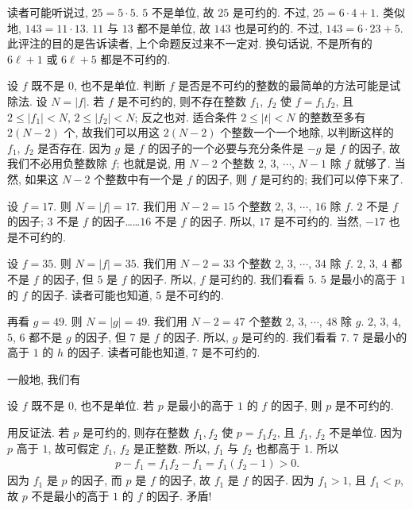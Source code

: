 \begin{remark}
    读者可能听说过, $25 = 5 \cdot 5$. $5$ 不是单位, 故 $25$ 是可约的. 不过, $25 = 6 \cdot 4 + 1$. 类似地, $143 = 11 \cdot 13$. $11$ 与 $13$ 都不是单位, 故 $143$ 也是可约的. 不过, $143 = 6 \cdot 23 + 5$. 此评注的目的是告诉读者, 上个命题反过来不一定对. 换句话说, 不是所有的 $6\ell + 1$ 或 $6\ell + 5$ 都是不可约的.
\end{remark}

设 $f$ 既不是 $0$, 也不是单位. 判断 $f$ 是否是不可约的整数的最简单的方法可能是试除法. 设 $N = |f|$. 若 $f$ 是不可约的, 则不存在整数 $f_1$, $f_2$ 使 $f = f_1 f_2$, 且 $2 \leq |f_1| < N$, $2 \leq |f_2| < N$; 反之也对. 适合条件 $2 \leq |t| < N$ 的整数至多有 $2(N-2)$ 个, 故我们可以用这 $2(N-2)$ 个整数一个一个地除, 以判断这样的 $f_1$, $f_2$ 是否存在. 因为 $g$ 是 $f$ 的因子的一个必要与充分条件是 $-g$ 是 $f$ 的因子, 故我们不必用负整数除 $f$; 也就是说, 用 $N-2$ 个整数 $2$, $3$, $\cdots$, $N-1$ 除 $f$ 就够了. 当然, 如果这 $N-2$ 个整数中有一个是 $f$ 的因子, 则 $f$ 是可约的; 我们可以停下来了.

\begin{example}
    设 $f = 17$. 则 $N = |f| = 17$. 我们用 $N-2=15$ 个整数 $2$, $3$, $\cdots$, $16$ 除 $f$. $2$ 不是 $f$ 的因子; $3$ 不是 $f$ 的因子……$16$ 不是 $f$ 的因子. 所以, $17$ 是不可约的. 当然, $-17$ 也是不可约的.
\end{example}

\begin{example}
    设 $f = 35$. 则 $N = |f| = 35$. 我们用 $N-2=33$ 个整数 $2$, $3$, $\cdots$, $34$ 除 $f$. $2$, $3$, $4$ 都不是 $f$ 的因子, 但 $5$ 是 $f$ 的因子. 所以, $f$ 是可约的. 我们看看 $5$. $5$ 是最小的高于 $1$ 的 $f$ 的因子. 读者可能也知道, $5$ 是不可约的.

    再看 $g = 49$. 则 $N = |g| = 49$. 我们用 $N-2=47$ 个整数 $2$, $3$, $\cdots$, $48$ 除 $g$. $2$, $3$, $4$, $5$, $6$ 都不是 $g$ 的因子, 但 $7$ 是 $f$ 的因子. 所以, $g$ 是可约的. 我们看看 $7$. $7$ 是最小的高于 $1$ 的 $h$ 的因子. 读者可能也知道, $7$ 是不可约的.
\end{example}

一般地, 我们有
\begin{proposition}
    设 $f$ 既不是 $0$, 也不是单位. 若 $p$ 是最小的高于 $1$ 的 $f$ 的因子, 则 $p$ 是不可约的.
\end{proposition}

\begin{pf}
    用反证法. 若 $p$ 是可约的, 则存在整数 $f_1, f_2$ 使 $p = f_1 f_2$, 且 $f_1$, $f_2$ 不是单位. 因为 $p$ 高于 $1$, 故可假定 $f_1$, $f_2$ 是正整数. 所以, $f_1$ 与 $f_2$ 也都高于 $1$. 所以
    \begin{align*}
        p - f_1 = f_1 f_2 - f_1 = f_1 (f_2 - 1) > 0.
    \end{align*}
    因为 $f_1$ 是 $p$ 的因子, 而 $p$ 是 $f$ 的因子, 故 $f_1$ 是 $f$ 的因子. 因为 $f_1 > 1$, 且 $f_1 < p$, 故 $p$ 不是最小的高于 $1$ 的 $f$ 的因子. 矛盾!
\end{pf}


